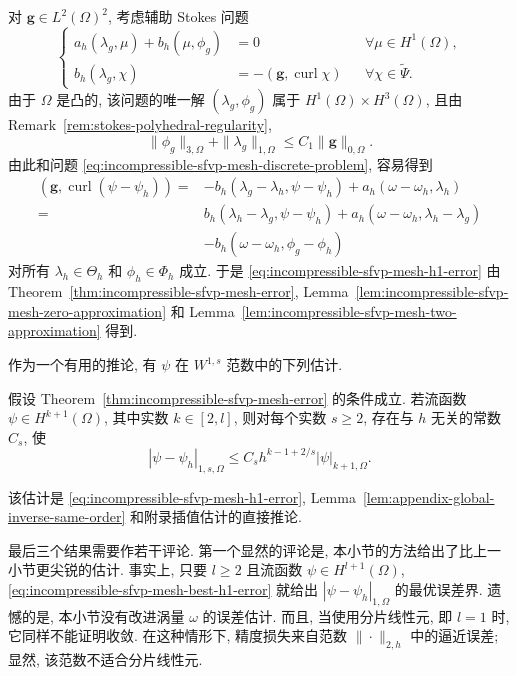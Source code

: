 \begin{Proof}
对 $\mathbf g\in L^2(\Omega)^2$, 考虑辅助 Stokes 问题
\[
\left\{
\begin{aligned}
a_h(\lambda_g,\mu)+b_h(\mu,\phi_g)&=0
&&\forall\mu\in H^1(\Omega),\\
b_h(\lambda_g,\chi)&=-(\mathbf g,\operatorname{curl}\chi)
&&\forall\chi\in\widetilde\Psi.
\end{aligned}
\right.
\]
由于 $\Omega$ 是凸的, 该问题的唯一解
$(\lambda_g,\phi_g)$ 属于 $H^1(\Omega)\times H^3(\Omega)$,
且由 Remark~\ref{rem:stokes-polyhedral-regularity},
\[
\|\phi_g\|_{3,\Omega}+\|\lambda_g\|_{1,\Omega}
\leq C_1\|\mathbf g\|_{0,\Omega}.
\]
由此和问题 \eqref{eq:incompressible-sfvp-mesh-discrete-problem},
容易得到
\[
\begin{split}
(\mathbf g,\operatorname{curl}(\psi-\psi_h))
={}&-b_h(\lambda_g-\lambda_h,\psi-\psi_h)
+a_h(\omega-\omega_h,\lambda_h)\\
={}&b_h(\lambda_h-\lambda_g,\psi-\psi_h)
+a_h(\omega-\omega_h,\lambda_h-\lambda_g)\\
&-b_h(\omega-\omega_h,\phi_g-\phi_h)
\end{split}
\]
对所有 $\lambda_h\in\Theta_h$ 和 $\phi_h\in\Phi_h$ 成立.
于是 \eqref{eq:incompressible-sfvp-mesh-h1-error}
由 Theorem~\ref{thm:incompressible-sfvp-mesh-error},
Lemma~\ref{lem:incompressible-sfvp-mesh-zero-approximation}
和 Lemma~\ref{lem:incompressible-sfvp-mesh-two-approximation} 得到.
\end{Proof}

作为一个有用的推论, 有 $\psi$ 在 $W^{1,s}$ 范数中的下列估计.

\begin{Corollary}\label{cor:incompressible-sfvp-mesh-w1s-error}
假设 Theorem~\ref{thm:incompressible-sfvp-mesh-error} 的条件成立.
若流函数 $\psi\in H^{k+1}(\Omega)$,
其中实数 $k\in[2,l]$, 则对每个实数 $s\geq2$,
存在与 $h$ 无关的常数 $C_s$, 使
\begin{equation}\label{eq:incompressible-sfvp-mesh-w1s-error}
|\psi-\psi_h|_{1,s,\Omega}
\leq C_sh^{k-1+2/s}|\psi|_{k+1,\Omega}.
\end{equation}
\end{Corollary}

该估计是 \eqref{eq:incompressible-sfvp-mesh-h1-error},
Lemma~\ref{lem:appendix-global-inverse-same-order}
和附录插值估计的直接推论.

最后三个结果需要作若干评论.
第一个显然的评论是, 本小节的方法给出了比上一小节更尖锐的估计.
事实上, 只要 $l\geq2$ 且流函数 $\psi\in H^{l+1}(\Omega)$,
\eqref{eq:incompressible-sfvp-mesh-best-h1-error}
就给出 $|\psi-\psi_h|_{1,\Omega}$ 的最优误差界.
遗憾的是, 本小节没有改进涡量 $\omega$ 的误差估计.
而且, 当使用分片线性元, 即 $l=1$ 时,
它同样不能证明收敛.
在这种情形下, 精度损失来自范数 $\|\cdot\|_{2,h}$ 中的逼近误差;
显然, 该范数不适合分片线性元.

